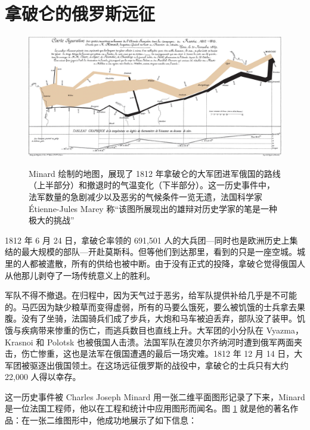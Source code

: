 \documentclass[
  b5paper,
  UTF8,twoside]{book}
\begin{document}
\section{拿破仑的俄罗斯远征}\label{sec:charles-joseph-minard}



\begin{figure}

{\centering \href{https://en.wikipedia.org/wiki/Charles_Joseph_Minard}{\includegraphics{images/Minard} }

}

\caption[Charles Joseph Minard 的拿破仑远征图 ]{Minard 绘制的地图，展现了 1812 年拿破仑的大军团进军俄国的路线（上半部分）和撤退时的气温变化（下半部分）。这一历史事件中，法军数量的急剧减少以及恶劣的气候条件一览无遗，法国科学家 Étienne-Jules Marey 称``该图所展现出的雄辩对历史学家的笔是一种极大的挑战''}\label{fig:minard}
\end{figure}

1812 年 6 月 24 日，拿破仑率领的 691,501 人的大兵团---同时也是欧洲历史上集结的最大规模的部队---开赴莫斯科。但等他们到达那里，看到的只是一座空城。城里的人都被遣散，所有的供给也被中断。由于没有正式的投降，拿破仑觉得俄国人从他那儿剥夺了一场传统意义上的胜利。

军队不得不撤退。在归程中，因为天气过于恶劣，给军队提供补给几乎是不可能的。马匹因为缺少粮草而变得虚弱，所有的马要么饿死，要么被饥饿的士兵拿去果腹。没有了坐骑，法国骑兵们成了步兵，大炮和马车被迫丢弃，部队没了装甲。饥饿与疾病带来惨重的伤亡，而逃兵数目也直线上升。大军团的小分队在 Vyazma，Krasnoi 和 Polotsk 也被俄国人击溃。法国军队在渡贝尔齐纳河时遭到俄军两面夹击，伤亡惨重，这也是法军在俄国遭遇的最后一场灾难。1812 年 12 月 14 日，大军团被驱逐出俄国领土。在这场远征俄罗斯的战役中，拿破仑的士兵只有大约 22,000 人得以幸存。

这一历史事件被 Charles Joseph Minard 用一张二维平面图形记录了下来，Minard 是一位法国工程师，他以在工程和统计中应用图形而闻名。图 \ref{fig:minard} 就是他的著名作品：在一张二维图形中，他成功地展示了如下信息：
\end{document}
